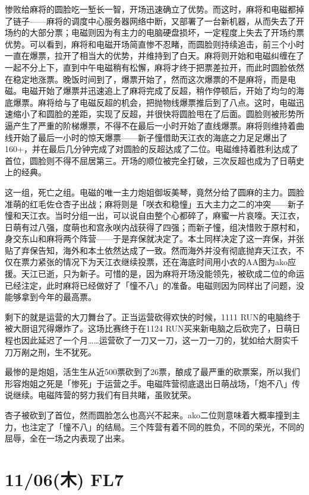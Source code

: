 惨败给麻将的圆脸吃一堑长一智，开场迅速确立了优势。而这时，麻将和电磁都掉了链子——麻将的调度中心服务器网络中断，又部署了一台新机器，从而失去了开场约的大部分票；电磁则因为有主力的电脑硬盘损坏，一定程度上失去了开场约票优势。可以看到，麻将和电磁开场简直惨不忍睹，而圆脸则持续追击，前三个小时一直在爆票，拉开了相当大的优势，并维持到了白天。麻将则开始和电磁纠缠在了一起不分上下，直到中午电磁稍有松懈，麻将才终于把票差拉开，而此时圆脸依然在稳定地涨票。晚饭时间到了，爆票开始了，然而这次爆票的不是麻将，而是电磁。电磁开始了爆票并迅速追上了麻将完成了反超，稍作停顿后，开始了均匀的海底爆票。麻将给与了电磁反超的机会，把抛物线爆票推后到了八点。这时，电磁迅速缩小了和圆脸的差距，实现了反超，并很快将圆脸甩在了后面。圆脸则被形势所逼产生了严重的阶梯爆票，不得不在最后一小时开始了直线爆票。麻将则维持着曲线开始了最后一小时的惊天爆票——新子憧借助天江衣的海底之力足足爆出了160+，并在最后几分钟完成了对圆脸的反超达成了二位。电磁维持着胜利达成了首位，圆脸则不得不屈居第三。开场的顺位被完全打破，三次反超也成为了日萌史上的经典。

这一组，死亡之组。电磁的唯一主力炮姐御坂美琴，竟然分给了圆麻的主力。圆脸准萌的红毛佐仓杏子出战；麻将则是「咲衣和稳憧」五大主力之二的冲突——新子憧和天江衣。当时分组一出，可以说自由整个心都碎了，麻蜜一片哀嚎。天江衣，日萌有过八强，度萌也和宫永咲内战获得了四强；而新子憧，组决惜败于原村和，身交东山和麻将两个阵营——于是弃保就决定了。本土同样决定了这一弃保，并张贴了弃保告知，海外和本土依然达成了一致。然而海外并没有彻底抛弃天江衣，不仅在票力紧张的情况下为天江衣继续投票，还在海底时间用小衣的AA图为ako应援。天江已逝，只为新子。可惜的是，因为麻将开场没能领先，被砍成二位的命运已经注定，此时麻将已经做好了「憧不八」的准备。电磁则因为同样出了问题，没能够拿到今年的最高票。

剩下的就是运营的大刀舞台了。正当运营砍得欢快的时候，1111 RUN的电脑终于被大厨诅咒得爆炸了。这场比赛终于在1124 RUN买来新电脑之后砍完了，日萌日程也因此延迟了一个月……运营砍了一刀又一刀，这一刀一刀的，犹如给大厨实千刀万剐之刑，生不犹死。

最惨的是炮姐，活生生从近500票砍到了26票，酿成了最严重的砍票案，所以我们形容炮姐之死是「惨死」于运营之手。电磁阵营彻底退出日萌战场，「炮不八」传说继续。电磁阵营的努力我们有目共睹，虽败犹荣。

杏子被砍到了首位，然而圆脸怎么也高兴不起来。ako二位则意味着大概率撞到主力，也注定了「憧不八」的结局。三个阵营有着不同的胜负，不同的荣光，不同的屈辱，全在一场之内表现了出来。

\section{11/06(木) FL7}

